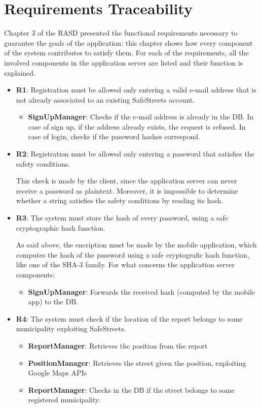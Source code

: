 \documentclass[12pt,a4paper]{report}
\begin{document}
	\chapter{Requirements Traceability}
	Chapter 3 of the RASD presented the functional requirements necessary
	to guarantee the goals of the application: this chapter shows how every
	component of the system contributes to satisfy them. For each of the requirements,
	all the involved components in the application server are listed and their function
	is explained.
	\begin{itemize}
	\item\textbf{R1}: Registration must be allowed only entering a valid e-mail address that is not already associated to an existing SafeStreets account.
		\begin{itemize}
		\item\textbf{SignUpManager}: Checks if the e-mail address is already in the DB. In case of sign up, if the address already exists, the request is refused.
		In case of login, checks if the password hashes correspond.
		\end{itemize}
		
	\item\textbf{R2}: Registration must be allowed only entering a password that satisfies the safety conditions.

		This check is made by the client, since the application server can never receive a password as plaintext. Moreover, it is impossible to determine whether
		a string satisfies the safety conditions by reading its hash.
		
	\item\textbf{R3}: The system must store the hash of every password, using a safe cryptographic hash function.

		As said above, the encription must be made by the mobile application, which computes the hash of the password using a safe cryptografic hash function, like one of the SHA-3 family. For what concerns the application server components:
		\begin{itemize}
		\item\textbf{SignUpManager}: Forwards the received hash (computed by the mobile app) to the DB.
		\end{itemize}
		
	\item\textbf{R4}: The system must check if the location of the report belongs to some municipality exploiting SafeStreets.
		\begin{itemize}
		\item\textbf{ReportManager}: Retrieves the position from the report
		\item\textbf{PositionManager}: Retrieves the street given the position, exploiting Google Maps APIs		
		\item\textbf{ReportManager}: Checks in the DB if the street belongs to some registered municipality.
		\end{itemize}
	

\end{itemize}
\end{document}
